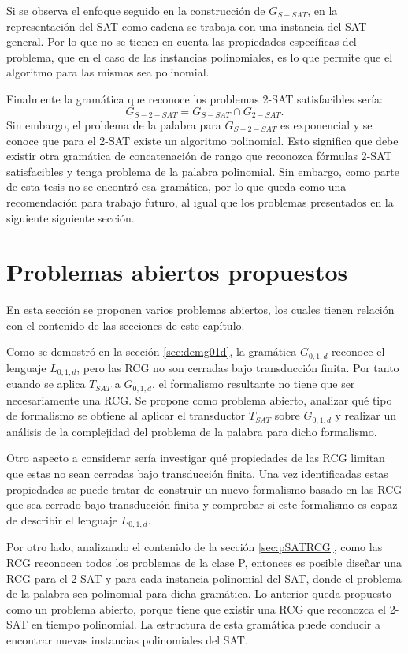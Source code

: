 Si se observa el enfoque seguido en la construcción de $G_{S-SAT}$, en la representación del SAT como cadena se trabaja con una instancia del SAT general. Por lo que no se tienen en cuenta las propiedades específicas del problema, que en el caso de las instancias polinomiales, es lo que permite que el algoritmo para las mismas sea polinomial.

Finalmente la gramática que reconoce los problemas 2-SAT satisfacibles sería:
$$G_{S-2-SAT}=G_{S-SAT}\cap G_{2-SAT}.$$
Sin embargo, el problema de la palabra para $G_{S-2-SAT}$ es exponencial y se conoce que para el 2-SAT existe un algoritmo polinomial. Esto significa que debe existir otra gramática de concatenación de rango que reconozca fórmulas 2-SAT satisfacibles y tenga problema de la palabra polinomial. Sin embargo, como parte de esta tesis no se encontró esa gramática, por lo que queda como una recomendación para trabajo futuro, al igual que los problemas presentados en la siguiente siguiente sección.

\section{Problemas abiertos propuestos}

En esta sección se proponen varios problemas abiertos, los cuales tienen relación con el contenido de las secciones
de este capítulo.

Como se demostró en la sección \ref{sec:demg01d}, la gramática $G_{0,1,d}$ reconoce el lenguaje $L_{0,1,d}$, pero las RCG no son cerradas bajo transducción finita. Por tanto cuando se aplica $T_{SAT}$ a $G_{0,1,d}$, el formalismo resultante no tiene que ser necesariamente una RCG. Se propone como problema abierto, analizar qué tipo de formalismo se obtiene al aplicar el transductor $T_{SAT}$ sobre $G_{0,1,d}$ y realizar un análisis de la complejidad del problema de la palabra para dicho formalismo.

Otro aspecto a considerar sería investigar qué propiedades de las RCG limitan que estas no sean cerradas bajo transducción finita.  Una vez identificadas estas propiedades se puede tratar de construir un nuevo formalismo basado en las RCG que sea cerrado bajo transducción finita y comprobar si este formalismo es capaz de describir el lenguaje $L_{0,1,d}$.

Por otro lado, analizando el contenido de la sección \ref{sec:pSATRCG}, como las RCG reconocen todos los problemas de la clase P, entonces es posible diseñar una RCG para el 2-SAT y para cada instancia polinomial del SAT, donde el problema de la palabra sea polinomial para dicha gramática.  Lo anterior queda propuesto como un problema abierto, porque tiene que existir una RCG que reconozca el 2-SAT en tiempo polinomial. La estructura de esta gramática puede conducir a encontrar nuevas instancias polinomiales del SAT.


